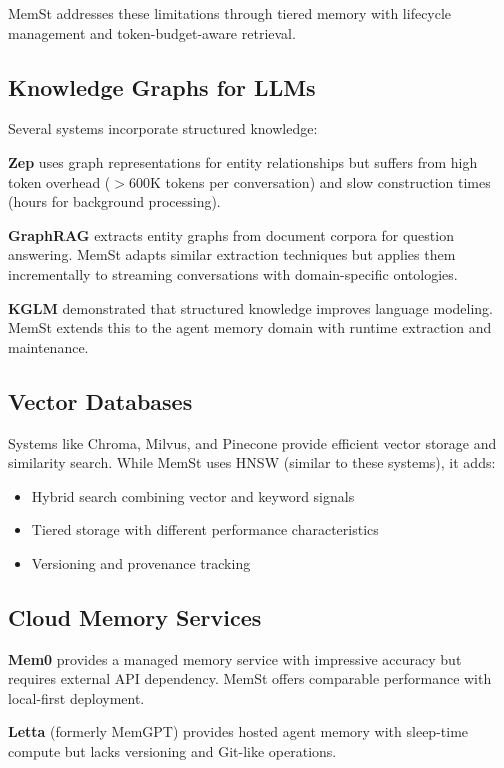 MemSt addresses these limitations through tiered memory with lifecycle management and token-budget-aware retrieval.

\subsection{Knowledge Graphs for LLMs}

Several systems incorporate structured knowledge:

\textbf{Zep} \citep{rasmussen2025zep} uses graph representations for entity relationships but suffers from high token overhead ($>$600K tokens per conversation) and slow construction times (hours for background processing).

\textbf{GraphRAG} \citep{edge2024local} extracts entity graphs from document corpora for question answering. MemSt adapts similar extraction techniques but applies them incrementally to streaming conversations with domain-specific ontologies.

\textbf{KGLM} \citep{logan2019baracks} demonstrated that structured knowledge improves language modeling. MemSt extends this to the agent memory domain with runtime extraction and maintenance.

\subsection{Vector Databases}

Systems like Chroma, Milvus, and Pinecone provide efficient vector storage and similarity search. While MemSt uses HNSW (similar to these systems), it adds:
\begin{itemize}
    \item Hybrid search combining vector and keyword signals
    \item Tiered storage with different performance characteristics
    \item Versioning and provenance tracking
\end{itemize}

\subsection{Cloud Memory Services}

\textbf{Mem0} \citep{chhikara2025mem0} provides a managed memory service with impressive accuracy but requires external API dependency. MemSt offers comparable performance with local-first deployment.

\textbf{Letta} (formerly MemGPT) provides hosted agent memory with sleep-time compute but lacks versioning and Git-like operations.


